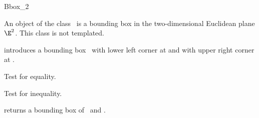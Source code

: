 \begin{ccRefClass} {Bbox_2}

\ccDefinition  An object  of the class \ccRefName\ is a bounding 
box in the two-dimensional Euclidean plane $\E^2$. This class is not templated.

\ccCreation
{}

            {introduces a bounding box \ccVar\ with lower left corner at 
              and with upper right corner at 
             .}


\ccOperations

\ccHidden{}
       {Test for equality.}

\ccHidden{}
       {Test for inequality.}

\ccGlue
{}
\ccGlue
{}
\ccGlue
{}

       {returns a bounding box of \ccVar\ and .}

\ccSeeAlso
{}
\end{ccRefClass} 
